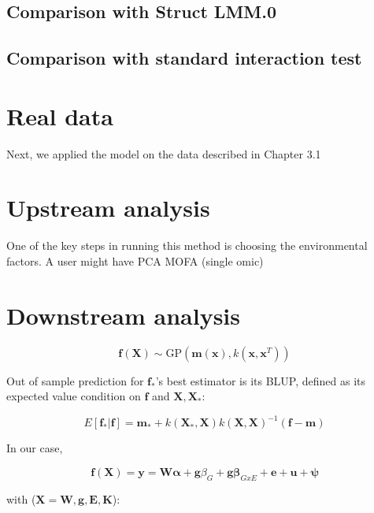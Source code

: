 \subsection{Comparison with Struct LMM.0}

\subsection{Comparison with standard interaction test}

\section{Real data}

Next, we applied the model on the data described in Chapter 3.1

\section{Upstream analysis}

One of the key steps in running this method is choosing the environmental factors.
A user might have 
PCA
MOFA (single omic)

\section{Downstream analysis} 

\begin{equation}
    \mathbf{f}(\mathbf{X}) \sim \mathrm{GP}(\mathbf{m}(\mathbf{x}), k(\mathbf{x},\mathbf{x}^T))
\end{equation}

Out of sample prediction for $\mathbf{f}_*$'s best estimator is its BLUP, defined as its expected value condition on $\mathbf{f}$ and $\mathbf{X},\mathbf{X}_*$:

\begin{equation}
    E[\mathbf{f}_*|\mathbf{f}] = \mathbf{m}_* +k(\mathbf{X}_*,\mathbf{X})k(\mathbf{X},\mathbf{X})^{-1}(\mathbf{f}-\mathbf{m})
\end{equation}

In our case,

\begin{equation}
    \mathbf{f}(\mathbf{X}) = \mathbf{y} = \mathbf{W}\boldsymbol{\alpha}+\mathbf{g}\beta_G+\mathbf{g}\boldsymbol{\beta}_{GxE}+\mathbf{e} + \mathbf{u} + \boldsymbol{\psi}
\end{equation}

with ($\mathbf{X} = {\mathbf{W},\mathbf{g},\mathbf{E},\mathbf{K}}$):

